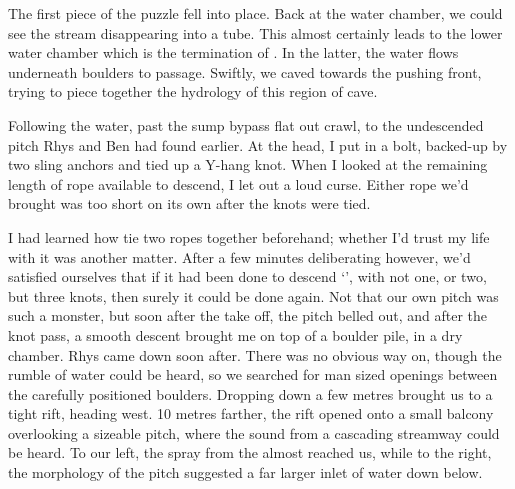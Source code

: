 	The first piece of the puzzle fell into place. Back at the water chamber, we could see the stream disappearing into a tube. This almost certainly leads to the lower water chamber which is the termination of . In the latter, the water flows underneath boulders to  passage. Swiftly, we caved towards the pushing front, trying to piece together the hydrology of this region of cave.



 Following the water, past the sump bypass flat out crawl, to the undescended pitch Rhys and Ben had found earlier. At the head, I put in a bolt, backed-up by two sling anchors and tied up a Y-hang knot. When I looked at the remaining length of rope available to descend, I let out a loud curse. Either rope we'd brought was too short on its own after the knots were tied.



    I had learned how tie two ropes together beforehand; whether I'd trust my life with it was another matter. After a few minutes deliberating however, we'd satisfied ourselves that if it had been done to descend `', with not one, or two, but three knots, then surely it could be done again. Not that our own pitch was such a monster, but soon after the take off, the pitch belled out, and after the knot pass, a smooth descent brought me on top of a boulder pile, in a dry chamber. Rhys came down soon after. There was no obvious way on, though the rumble of water could be heard, so we searched for man sized openings between the carefully positioned boulders. Dropping down a few metres brought us to a tight rift, heading west. 10 metres farther, the rift opened onto a small balcony overlooking a sizeable pitch, where the sound from a cascading streamway could be heard. To our left, the spray from the  almost reached us, while to the right, the morphology of the pitch suggested a far larger inlet of water down below.




